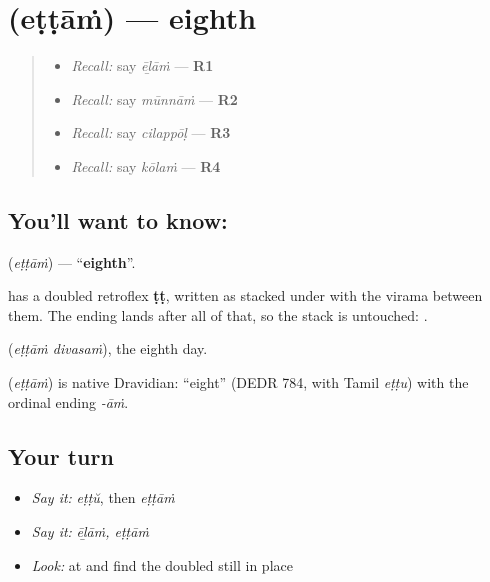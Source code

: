 \section[\texorpdfstring{\ml{എട്ടാം} (eṭṭāṁ)}{എട്ടാം (eṭṭāṁ)}]{ (eṭṭāṁ) — eighth}

\label{lesson:ML-C68-eighth}



\begin{quote}
\begin{itemize}
\raggedright
  \item \emph{Recall:} say \emph{ēḻāṁ} — \textbf{R1}
  \item \emph{Recall:} say \emph{mūnnāṁ} — \textbf{R2}
  \item \emph{Recall:} say \emph{cilappōḷ} — \textbf{R3}
  \item \emph{Recall:} say \emph{kōlaṁ} — \textbf{R4}
\end{itemize}
\end{quote}

\subsection*{You'll want to know: }
\textbf{} (\emph{eṭṭāṁ}) — \textquotedblleft{}\textbf{eighth}\textquotedblright{}.

\textbf{} has a doubled retroflex \textbf{ṭṭ}, written as  stacked under  with the virama between them. The ending lands after all of that, so the stack is untouched: \textbf{}.

\textbf{ } (\emph{eṭṭāṁ divasaṁ}), the eighth day.

\begin{cousinweb}
\textbf{} (\emph{eṭṭāṁ}) is native Dravidian: \textquotedblleft{}eight\textquotedblright{} (DEDR 784, with Tamil \emph{eṭṭu}) with the ordinal ending \emph{-āṁ}.
\end{cousinweb}

\subsection*{Your turn}
\begin{itemize}
\raggedright
  \item \emph{Say it:} \emph{eṭṭŭ}, then \emph{eṭṭāṁ}
  \item \emph{Say it:} \emph{ēḻāṁ, eṭṭāṁ}
  \item \emph{Look:} at  and find the doubled  still in place
\end{itemize}


